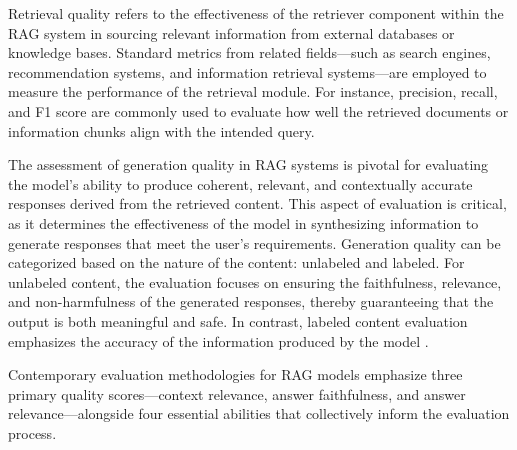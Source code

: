 Retrieval quality refers to the effectiveness of the retriever component within the RAG system in sourcing relevant information from external databases or knowledge bases. Standard metrics from related fields—such as search engines, recommendation systems, and information retrieval systems—are employed to measure the performance of the retrieval module. For instance, precision, recall, and F1 score are commonly used to evaluate how well the retrieved documents or information chunks align with the intended query.

The assessment of generation quality in RAG systems is pivotal for evaluating the model’s ability to produce coherent, relevant, and contextually accurate responses derived from the retrieved content. This aspect of evaluation is critical, as it determines the effectiveness of the model in synthesizing information to generate responses that meet the user's requirements. Generation quality can be categorized based on the nature of the content: unlabeled and labeled. For unlabeled content, the evaluation focuses on ensuring the faithfulness, relevance, and non-harmfulness of the generated responses, thereby guaranteeing that the output is both meaningful and safe. In contrast, labeled content evaluation emphasizes the accuracy of the information produced by the model \cite{gao2023retrieval}.

Contemporary evaluation methodologies for RAG models emphasize three primary quality scores—context relevance, answer faithfulness, and answer relevance—alongside four essential abilities that collectively inform the evaluation process.

